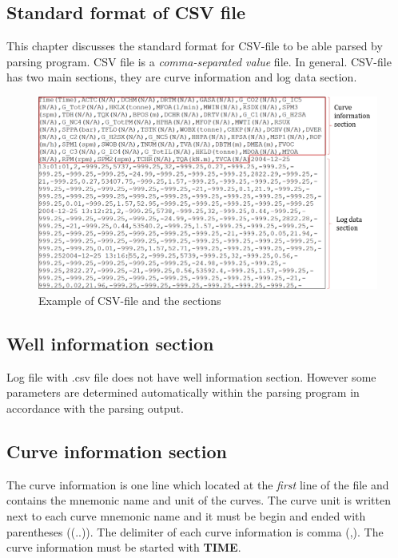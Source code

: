 \documentclass[12pt,a4paper,oneside]{report}
\begin{document}
\begin{appendices}
\chapter{Standard format of CSV file}
\label{ch:csv_std}
This chapter discusses the standard format for CSV-file to be able parsed by parsing program. CSV file is a \emph{comma-separated value} file. In general. CSV-file has two main sections, they are curve information and log data section.

\begin{figure}[ht]
\centering
\includegraphics[width=\textwidth]{fig/csv_example.png}
\caption{Example of CSV-file and the sections}
\end{figure}


\section{Well information section}
Log file with .csv file does not have well information section. However some parameters are determined automatically within the parsing program in accordance with the parsing output.

\section{Curve information section}
The curve information is one line which located at the \emph{first} line of the file and contains the mnemonic name and unit of the curves. The curve unit is written next to each curve mnemonic name and it must be begin and ended with parentheses ((..)). The delimiter of each curve information is comma (,). The curve information must be started with \textbf{TIME}.

\end{appendices}
\end{document}
